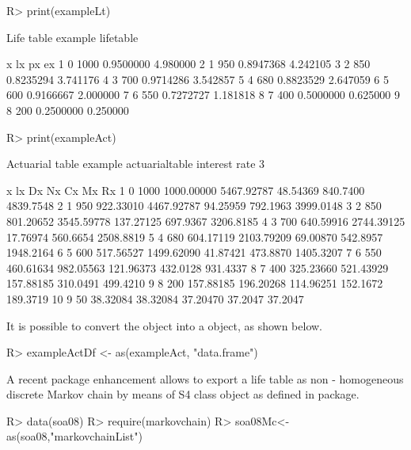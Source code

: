 \documentclass[nojss]{jss}
\begin{document}
\begin{Schunk}
\begin{Sinput}
R> print(exampleLt)
\end{Sinput}
\begin{Soutput}
Life table example lifetable 

  x   lx        px       ex
1 0 1000 0.9500000 4.980000
2 1  950 0.8947368 4.242105
3 2  850 0.8235294 3.741176
4 3  700 0.9714286 3.542857
5 4  680 0.8823529 2.647059
6 5  600 0.9166667 2.000000
7 6  550 0.7272727 1.181818
8 7  400 0.5000000 0.625000
9 8  200 0.2500000 0.250000
\end{Soutput}
\begin{Sinput}
R> print(exampleAct)
\end{Sinput}
\begin{Soutput}
Actuarial table  example actuarialtable interest rate  3 %

   x   lx         Dx         Nx        Cx       Mx        Rx
1  0 1000 1000.00000 5467.92787  48.54369 840.7400 4839.7548
2  1  950  922.33010 4467.92787  94.25959 792.1963 3999.0148
3  2  850  801.20652 3545.59778 137.27125 697.9367 3206.8185
4  3  700  640.59916 2744.39125  17.76974 560.6654 2508.8819
5  4  680  604.17119 2103.79209  69.00870 542.8957 1948.2164
6  5  600  517.56527 1499.62090  41.87421 473.8870 1405.3207
7  6  550  460.61634  982.05563 121.96373 432.0128  931.4337
8  7  400  325.23660  521.43929 157.88185 310.0491  499.4210
9  8  200  157.88185  196.20268 114.96251 152.1672  189.3719
10 9   50   38.32084   38.32084  37.20470  37.2047   37.2047
\end{Soutput}
\end{Schunk}

It is possible to convert the  object into a
 object, as shown below.

\begin{Schunk}
\begin{Sinput}
R> exampleActDf <- as(exampleAct, "data.frame")
\end{Sinput}
\end{Schunk}

A recent  package enhancement allows to export a life
table as non - homogeneous discrete Markov chain by means of
 S4 class object as defined in 
\citep{markovchainR}  package.

\begin{Schunk}
\begin{Sinput}
R> data(soa08)
R> require(markovchain)
R> soa08Mc<-as(soa08,"markovchainList")
\end{Sinput}
\end{Schunk}
\end{document}
